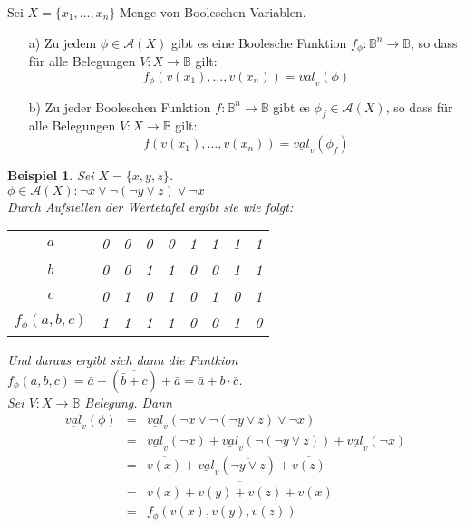 \documentclass[ngerman]{scrartcl}
\theoremstyle{custom}
\newtheorem{mex}[mdef]{Beispiel}
\newcommand{\ax}{\mathcal{A}(X)}
\newcommand{\val}{\underline{val}_v}
\newcommand{\0}{\mathbf{0}}
\newcommand{\1}{\mathbf{L}}
\begin{document}
Sei $X = \{x_1, \dots, x_n\}$ Menge von Booleschen Variablen. 
\begin{enumerate}
\item[a)] Zu jedem $\phi \in \ax$ gibt es eine Boolesche Funktion
  $f_{\phi}: \mathds{B}^n \rightarrow \mathds{B}$, so dass f\"ur alle
  Belegungen $V: X \rightarrow \mathds{B}$ gilt:
\begin{equation*}
f_{\phi}(v(x_1), \dots, v(x_n)) = \underline{val}_v(\phi)
\end{equation*}
\item[b)] Zu jeder Booleschen Funktion $f: \mathds{B}^n \rightarrow
  \mathds{B}$ gibt es $\phi_f \in \ax$, so dass f\"ur alle Belegungen
  $V: X \rightarrow \mathds{B}$ gilt:
\begin{equation*}
f(v(x_1), \dots, v(x_n)) = \underline{val}_v(\phi_f)
\end{equation*}
\end{enumerate}

\begin{mex}
Sei $X = \{x, y, z\}$.\\
$\phi \in \ax: \neg x \vee \neg (\neg y \vee z) \vee \neg x$\\
Durch Aufstellen der Wertetafel ergibt sie wie folgt:
\begin{tabular}{c|cccccccc}
$a$ & 0 & 0 & 0 & 0 & 1& 1 & 1 &1 \\
$b$ & 0 & 0 & 1 & 1 & 0 & 0 &1 &1 \\
$c$ & 0 & 1 &0 & 1 & 0 & 1 & 0 & 1\\
\hline $f_{\phi}(a,b,c)$ & 1 & 1 & 1 & 1 & 0 & 0  & 1 & 0 
\end{tabular}

Und daraus ergibt sich dann die Funtkion $f_{\phi}(a,b,c)= \bar a + (\overline{\bar b + c})+ \bar a = \bar a +
b \cdot \bar c$.\\

Sei $V: X \rightarrow \mathds{B}$ Belegung. Dann
\begin{eqnarray*}
\underline{val}_v(\phi) & = & \underline{val}_v(\neg x \vee \neg (\neg
y \vee z) \vee \neg x) \\
& = & \underline{val}_v(\neg x) + \val(\neg (\neg y \vee z)) +
\val(\neg x) \\
& = & \overline{v(x)} + \val(\overline{\neg y \vee z}) +
\overline{v(z)} \\
& = & \overline{v(x)} + \overline{\overline{v(y)} + v(z)} +
\overline{v(x)} \\
& = & f_{\phi}(v(x), v(y), v(z))
\end{eqnarray*}
\end{mex}
\end{document}
